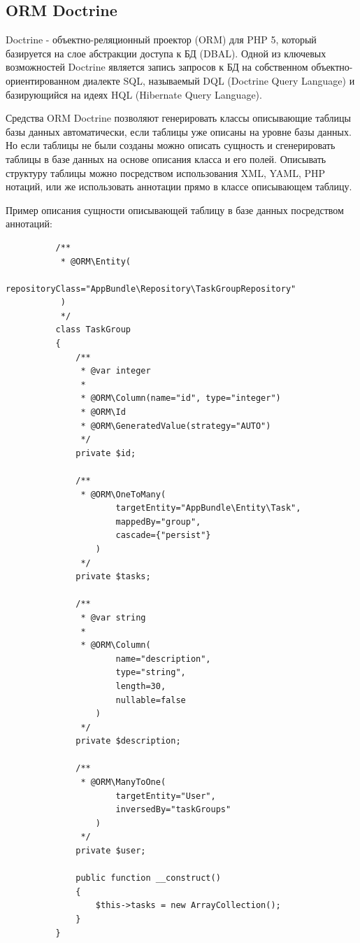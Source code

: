 \subsection{ORM Doctrine}
\label{sub:practice:doctrine}
Doctrine - объектно-реляционный проектор (ORM) для PHP 5, который базируется на слое абстракции доступа к БД (DBAL). Одной из ключевых возможностей Doctrine является запись запросов к БД на собственном объектно-ориентированном диалекте SQL, называемый DQL (Doctrine Query Language) и базирующийся на идеях HQL (Hibernate Query Language).

Средства ORM Doctrine позволяют генерировать классы описывающие таблицы базы данных автоматически, если таблицы уже описаны на уровне базы данных. Но если таблицы не были созданы можно описать сущность и сгенерировать таблицы в базе данных на основе описания класса и его полей. Описывать структуру таблицы можно посредством использования XML, YAML, PHP нотаций, или же использовать аннотации прямо в классе описывающем таблицу. 

Пример описания сущности описывающей таблицу в базе данных посредством аннотаций:
\begin{lstlisting}
          /**
           * @ORM\Entity(
                  repositoryClass="AppBundle\Repository\TaskGroupRepository"
           )
           */
          class TaskGroup
          {
              /**
               * @var integer
               *
               * @ORM\Column(name="id", type="integer")
               * @ORM\Id
               * @ORM\GeneratedValue(strategy="AUTO")
               */
              private $id;

              /**
               * @ORM\OneToMany(
                      targetEntity="AppBundle\Entity\Task",
                      mappedBy="group",
                      cascade={"persist"}
                  )
               */
              private $tasks;

              /**
               * @var string
               *
               * @ORM\Column(
                      name="description",
                      type="string",
                      length=30,
                      nullable=false
                  )
               */
              private $description;

              /**
               * @ORM\ManyToOne(
                      targetEntity="User",
                      inversedBy="taskGroups"
                  )
               */
              private $user;

              public function __construct()
              {
                  $this->tasks = new ArrayCollection();
              }
          }
\end{lstlisting}

